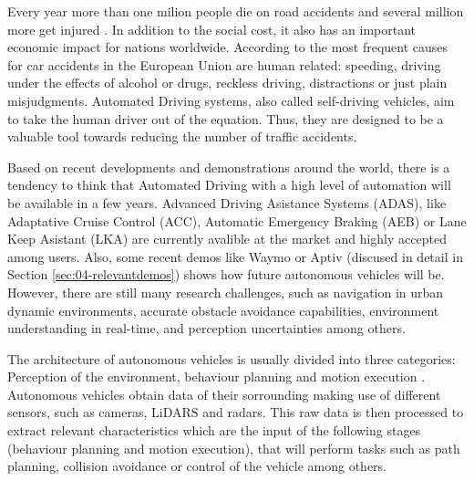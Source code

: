 Every year more than one milion people die on road accidents and several 
million more get injured \cite{world2015global}. In addition to the social cost, it also has an
important economic impact for nations worldwide. According to 
\cite{Thomas2013} the most frequent causes for car accidents in the
European Union are human related: speeding, driving under the effects of
alcohol or drugs, reckless driving, distractions or just plain misjudgments.
Automated Driving systems, also called self-driving vehicles, aim to take the 
human driver out of the equation. Thus, they are designed to be a valuable tool
towards reducing the number of traffic accidents.

Based on recent developments and demonstrations around the world, there is a 
tendency to think that Automated Driving with a high level of automation will 
be available in a few years. 
Advanced Driving Asistance Systems (ADAS), like Adaptative Cruise Control 
(ACC), Automatic Emergency Braking (AEB) or Lane Keep Asistant (LKA) are
currently avalible at the market \cite{Bengler2014} and highly accepted among
users. 
Also, some recent demos like Waymo or Aptiv (discused in detail in Section
\ref{sec:04-relevantdemos}) shows how future autonomous vehicles will be.
However, there are still many research challenges, such as navigation in urban 
dynamic environments, accurate obstacle avoidance capabilities, environment 
understanding in real-time, and perception uncertainties among others.
%

The architecture of autonomous vehicles is usually divided into three 
categories: Perception of the environment, behaviour planning and motion 
execution \cite{behere2015functional}. Autonomous 
vehicles obtain data of their sorrounding making use 
of different sensors, such as cameras, LiDARS and radars. This raw data is then 
processed to extract relevant characteristics which are the input of the 
following stages (behaviour planning and motion execution), that will 
perform tasks such as path planning, collision avoidance or control of the 
vehicle among others. 

